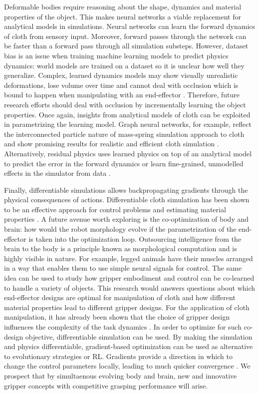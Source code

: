 \documentclass[\home/main.tex]{subfiles}
\begin{document}
Deformable bodies require reasoning about the shape, dynamics and material properties of the object. This makes neural networks a viable replacement for analytical models in simulations. Neural networks can learn the forward dynamics of cloth from sensory input. Moreover, forward passes through the network can be faster than a forward pass through all simulation substeps. 
However, dataset bias is an issue when training machine learning models to predict physics dynamics: world models are trained on a dataset so it is unclear how well they generalize. Complex, learned dynamics models may show visually unrealistic deformations, lose volume over time and cannot deal with occlusion which is bound to happen when manipulating with an end-effector \autocite{Mrowca2018, Li2018}. Therefore, future research efforts should deal with occlusion by incrementally learning the object properties. 
Once again, insights from analytical models of cloth can be exploited in parametrizing the learning model. Graph neural networks, for example, reflect the interconnected particle nature of mass-spring simulation approach to cloth and show promising results for realistic and efficient cloth simulation \autocite{pfaff2021learning}. Alternatively, residual physics uses learned physics on top of an analytical model to predict the error in the forward dynamics \autocite{Golemo2018} or learn fine-grained, unmodelled effects in the simulator from data \autocite{heiden2021neuralsim}.
 
Finally, differentiable simulations allows backpropagating gradients through the physical consequences of actions. Differentiable cloth simulation has been shown to be an effective approach for control problems and estimating material properties \autocite{Junbang2019,li2021diffcloth}.
A future avenue worth exploring is the co-optimization of body and brain: how would the robot morphology evolve if the parametrization of the end-effector is taken into the optimization loop. Outsourcing intelligence from the brain to the body is a principle known as morphological computation \autocite{Rolf2006} and is highly visible in nature. For example, legged animals have their muscles arranged in a way that enables them to use simple neural signals for control. The same idea can be used to study how gripper embodiment and control can be co-learned to handle a variety of objects. This research would answers  questions about which end-effector designs are optimal for manipulation of cloth and how different material properties lead to different gripper designs. For the application of cloth manipulation, it has already been shown that the choice of gripper design influences the complexity of the task dynamics \autocite{Borras2020}. In order to optimize for such co-design objective, differentiable simulation can be used. By making the simulation and physics differentiable, gradient-based optimization can be used as alternative to evolutionary strategies or \gls{RL}. Gradients provide a direction in which to change the control parameters locally, leading to much quicker convergence \autocite{Degrave2019}.
We prospect that by simultaenous evolving body and brain, new and innovative gripper concepts with competitive grasping performance will arise. 
\end{document}
